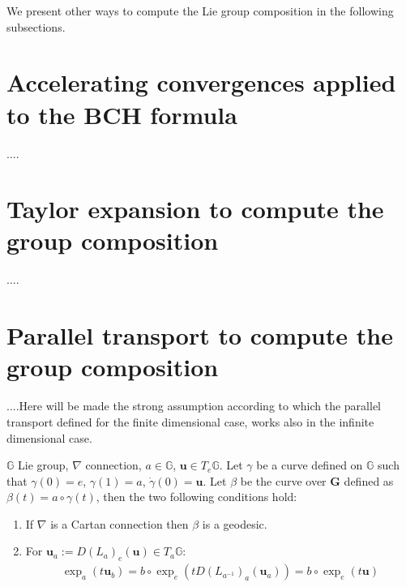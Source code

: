 We present other ways to compute the Lie group composition in the following subsections.

\section{Accelerating convergences applied to the BCH formula}

....

\section{Taylor expansion to compute the group composition}

....


\section{Parallel transport to compute the group composition}

....Here will be made the strong assumption according to which the parallel transport defined for the finite dimensional case, works also in the infinite dimensional case.

\begin{lemma}
	$\mathbb{G}$ Lie group, $\nabla$ connection, $a\in\mathbb{G}$, $\mathbf{u}\in T_{e}\mathbb{G}$. Let $\gamma$ be a curve defined on $\mathbb{G}$ such that $\gamma(0) = e$, $\gamma(1) = a$, $\dot{\gamma}(0) =\mathbf{u}$. Let $\beta$ be the curve over $\mathbf{G}$ defined as $\beta(t) = a\circ \gamma(t)$, then the two following conditions hold:
	\begin{enumerate}
		\item If $\nabla$ is a Cartan connection then $\beta$ is a geodesic.
		\item For $\mathbf{u}_{a} := D(L_{a})_{e}(\mathbf{u}) \in T_{a}\mathbb{G}$:
		\begin{align}
		\exp_{a}(t\mathbf{u}_{b}) = b\circ \exp_{e}( t D(L_{a^{-1}})_{a}(\mathbf{u}_{a}) ) = b\circ \exp_{e}(t\mathbf{u})
		\end{align}
	\end{enumerate}
\end{lemma}

